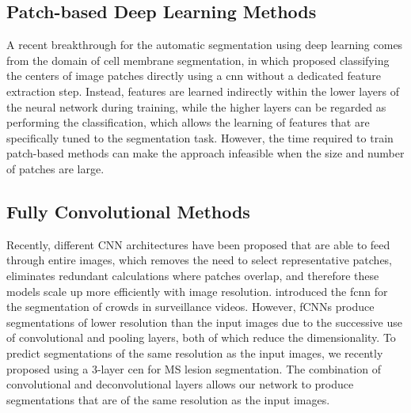 \subsection[Patch-based deep learning methods]{Patch-based Deep Learning
Methods}

A recent breakthrough for the automatic segmentation using deep learning comes
from the domain of cell membrane segmentation, in which \citet{ciresan2012}
proposed classifying the centers of image patches directly using a \gls{cnn}
\citep{lecun1998} without a dedicated feature extraction step. Instead, features
are learned indirectly within the lower layers of the neural network during
training, while the higher layers can be regarded as performing the
classification, which allows the learning of features that are specifically
tuned to the segmentation task. However, the time required to train patch-based
methods can make the approach infeasible when the size and number of patches are
large.

\subsection[Fully convolutional methods]{Fully Convolutional Methods}

Recently, different CNN architectures
\citep{long2015,ronneberger2015,brosch2015,kang2014fully} have been proposed
that are able to feed through entire images, which removes the need to select
representative patches, eliminates redundant calculations where patches overlap,
and therefore these models scale up more efficiently with image resolution.
\citet{kang2014fully} introduced the \gls{fcnn} for the segmentation of crowds
in surveillance videos. However, fCNNs produce segmentations of lower resolution
than the input images due to the successive use of convolutional and pooling
layers, both of which reduce the dimensionality. To predict segmentations of the
same resolution as the input images, we recently proposed using a 3-layer
\gls{cen} \citep{brosch2015} for MS lesion segmentation. The combination of
convolutional \citep{lecun1998} and deconvolutional \citep{zeiler2011} layers
allows our network to produce segmentations that are of the same resolution as
the input images.

